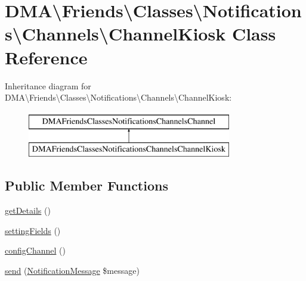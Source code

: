 \hypertarget{classDMA_1_1Friends_1_1Classes_1_1Notifications_1_1Channels_1_1ChannelKiosk}{}\section{D\+M\+A\textbackslash{}Friends\textbackslash{}Classes\textbackslash{}Notifications\textbackslash{}Channels\textbackslash{}Channel\+Kiosk Class Reference}
\label{classDMA_1_1Friends_1_1Classes_1_1Notifications_1_1Channels_1_1ChannelKiosk}
Inheritance diagram for D\+M\+A\textbackslash{}Friends\textbackslash{}Classes\textbackslash{}Notifications\textbackslash{}Channels\textbackslash{}Channel\+Kiosk\+:\begin{figure}[H]
\begin{center}
\leavevmode
\includegraphics[height=2.000000cm]{d5/d75/classDMA_1_1Friends_1_1Classes_1_1Notifications_1_1Channels_1_1ChannelKiosk}
\end{center}
\end{figure}
\subsection*{Public Member Functions}
\begin{DoxyCompactItemize}
\item 
\hyperlink{classDMA_1_1Friends_1_1Classes_1_1Notifications_1_1Channels_1_1ChannelKiosk_acbce00a29f080e7b4e6301a0f9edce34}{get\+Details} ()
\item 
\hyperlink{classDMA_1_1Friends_1_1Classes_1_1Notifications_1_1Channels_1_1ChannelKiosk_aed0a11ddc080fa7252d6fe6a3faa7b29}{setting\+Fields} ()
\item 
\hyperlink{classDMA_1_1Friends_1_1Classes_1_1Notifications_1_1Channels_1_1ChannelKiosk_ac40190da8647ca059590db8800bbbf2b}{config\+Channel} ()
\item 
\hyperlink{classDMA_1_1Friends_1_1Classes_1_1Notifications_1_1Channels_1_1ChannelKiosk_ab3ad4b0bf7c129767eb323528a439ed8}{send} (\hyperlink{classDMA_1_1Friends_1_1Classes_1_1Notifications_1_1NotificationMessage}{Notification\+Message} \$message)
\end{DoxyCompactItemize}
